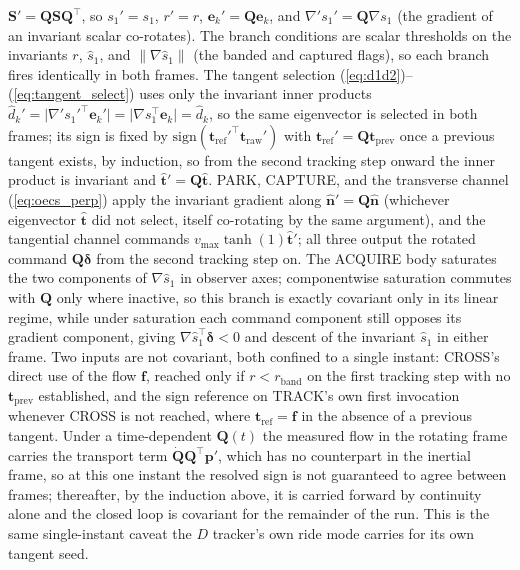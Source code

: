 \documentclass[lettersize,journal]{IEEEtran}
\begin{document}
\begin{IEEEproof}
$\mathbf{S}' = \mathbf{Q}\mathbf{S}\mathbf{Q}^\top$, so $s_1' = s_1$,
$r' = r$, $\mathbf{e}_k' = \mathbf{Q}\mathbf{e}_k$, and $\nabla' s_1' =
\mathbf{Q}\nabla s_1$ (the gradient of an invariant scalar co-rotates).
The branch conditions are scalar thresholds on the invariants $r$,
$\hat{s}_1$, and $\lVert\nabla\hat{s}_1\rVert$ (the banded and captured
flags), so each branch fires identically in both frames. The tangent
selection (\ref{eq:d1d2})--(\ref{eq:tangent_select}) uses only the
invariant inner products $\hat{d}_k' = \lvert\nabla' s_1'^\top
\mathbf{e}_k'\rvert = \lvert\nabla s_1^\top \mathbf{e}_k\rvert =
\hat{d}_k$, so the same eigenvector is selected in both frames; its
sign is fixed by $\mathrm{sign}(\mathbf{t}_{\text{ref}}'^\top
\mathbf{t}_{\text{raw}}')$ with $\mathbf{t}_{\text{ref}}' = \mathbf{Q}
\mathbf{t}_{\text{prev}}$ once a previous tangent exists, by induction,
so from the second tracking step onward the inner product is invariant
and $\hat{\mathbf{t}}' = \mathbf{Q}\hat{\mathbf{t}}$. PARK, CAPTURE, and
the transverse channel (\ref{eq:oecs_perp}) apply the invariant gradient
along $\hat{\mathbf{n}}' = \mathbf{Q}\hat{\mathbf{n}}$ (whichever
eigenvector $\hat{\mathbf{t}}$ did not select, itself co-rotating by the
same argument), and the tangential channel commands
$v_{\max}\tanh(1)\hat{\mathbf{t}}'$; all three output the rotated
command $\mathbf{Q}\boldsymbol{\delta}$ from the second tracking step
on. The ACQUIRE body saturates the two components of $\nabla\hat{s}_1$
in observer axes; componentwise saturation commutes with $\mathbf{Q}$
only where inactive, so this branch is exactly covariant only in its
linear regime, while under saturation each command component still
opposes its gradient component, giving $\nabla\hat{s}_1^\top
\boldsymbol{\delta} < 0$ and descent of the invariant $\hat{s}_1$ in
either frame. Two inputs are not covariant, both confined to a single
instant: CROSS's direct use of the flow $\mathbf{f}$, reached only if
$r < r_{\text{band}}$ on the first tracking step with no
$\mathbf{t}_{\text{prev}}$ established, and the sign reference on
TRACK's own first invocation whenever CROSS is not reached, where
$\mathbf{t}_{\text{ref}} = \mathbf{f}$ in the absence of a previous
tangent. Under a time-dependent $\mathbf{Q}(t)$ the measured flow in the
rotating frame carries the transport term
$\dot{\mathbf{Q}}\mathbf{Q}^\top\mathbf{p}'$, which has no counterpart
in the inertial frame, so at this one instant the resolved sign is not
guaranteed to agree between frames; thereafter, by the induction above,
it is carried forward by continuity alone and the closed loop is
covariant for the remainder of the run. This is the same single-instant
caveat the $D$ tracker's own ride mode carries for its own tangent seed.
\end{IEEEproof}
\end{document}
